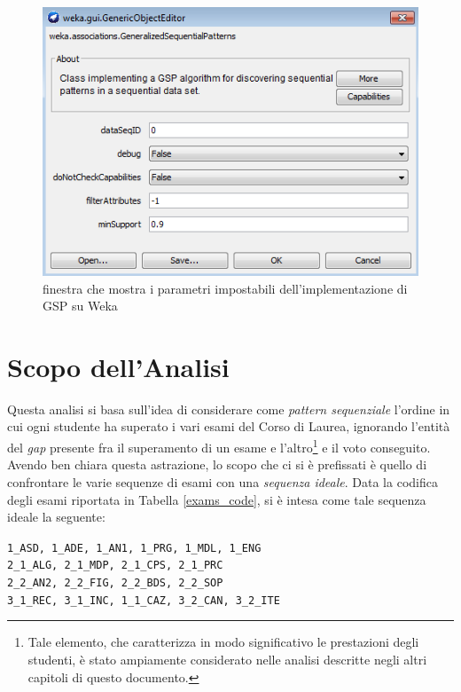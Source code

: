     \begin{figure}
        \centering
        \caption{finestra che mostra i parametri impostabili dell'implementazione di GSP su Weka}
        \label{gsp_weka}
        \includegraphics[scale=0.75]{img/gsp.png}
    \end{figure}

\section{Scopo dell'Analisi}

    Questa analisi si basa sull'idea di considerare come \textit{pattern sequenziale} l'ordine in cui ogni studente ha superato i vari esami del Corso di Laurea, ignorando l'entità del \textit{gap} presente fra il superamento di un esame e l'altro\footnote{Tale elemento, che caratterizza in modo significativo le prestazioni degli studenti, è stato ampiamente considerato nelle analisi descritte negli altri capitoli di questo documento.} e il voto conseguito.\\

    Avendo ben chiara questa astrazione, lo scopo che ci si è prefissati è quello di confrontare le varie sequenze di esami con una \textit{sequenza ideale}. Data la codifica degli esami riportata in Tabella \ref{exams_code}, si è intesa come tale sequenza ideale la seguente: \\

    \begin{centering}
        \texttt{1\_ASD, 1\_ADE, 1\_AN1, 1\_PRG, 1\_MDL, 1\_ENG} \\
        \texttt{2\_1\_ALG, 2\_1\_MDP, 2\_1\_CPS, 2\_1\_PRC} \\
        \texttt{2\_2\_AN2, 2\_2\_FIG, 2\_2\_BDS, 2\_2\_SOP} \\
        \texttt{3\_1\_REC, 3\_1\_INC, 1\_1\_CAZ, 3\_2\_CAN, 3\_2\_ITE} \\
    \end{centering}

